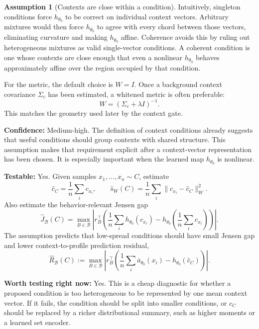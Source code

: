 \documentclass[11pt]{article}
\theoremstyle{definition}
\theoremstyle{definition}
\theoremstyle{assumptionstyle}
\newtheorem{assumption}{Assumption}[section]
\newcounter{prediction}
\begin{document}
\begin{assumption}[Contexts are close within a condition]
Intuitively, singleton conditions force \(h_{\theta_0}\) to be correct on
individual context vectors. Arbitrary mixtures would then force
\(h_{\theta_0}\) to agree with every chord between those vectors, eliminating
curvature and making \(h_{\theta_0}\) affine. Coherence avoids this by ruling out
heterogeneous mixtures as valid single-vector conditions. A coherent condition is
one whose contexts are close enough that even a nonlinear \(h_{\theta_0}\) behaves
approximately affine over the region occupied by that condition.

For the metric, the default choice is \(W=I\). Once a background context
covariance \(\Sigma_c\) has been estimated, a whitened metric is often preferable:
\[
W=(\Sigma_c+\lambda I)^{-1}.
\]
This matches the geometry used later by the context gate.
\end{assumption}
\textbf{Confidence:} Medium-high. The definition of context conditions already
suggests that useful conditions should group contexts with shared structure. This
assumption makes that requirement explicit after a context-vector representation
has been chosen. It is especially important when the learned map
\(h_{\theta_0}\) is nonlinear.

\textbf{Testable:} Yes. Given samples \(x_1,\ldots,x_n\sim C\), estimate
\[
\widehat c_C=\frac1n\sum_i c_{x_i},
\qquad
\widehat s_W(C)
=
\frac1n\sum_i\|c_{x_i}-\widehat c_C\|_W^2.
\]
Also estimate the behavior-relevant Jensen gap
\[
\widehat J_{\mathcal B}(C)
=
\max_{B\in\mathcal B}
\left|
r_B^\top
\left(
\frac1n\sum_i h_{\theta_0}(c_{x_i})
-
h_{\theta_0}\!\left(\frac1n\sum_i c_{x_i}\right)
\right)
\right|.
\]
The assumption predicts that low-spread conditions should have small Jensen gap
and lower context-to-profile prediction residual,
\[
\widehat R_{\mathcal B}(C)
:=
\max_{B\in\mathcal B}
\left|
r_B^\top
\left(
\frac1n\sum_i \bar a_{\theta_0}(x_i)
-
h_{\theta_0}(\widehat c_C)
\right)
\right|.
\]

\textbf{Worth testing right now:} Yes. This is a cheap diagnostic for whether a
proposed condition is too heterogeneous to be represented by one mean context
vector. If it fails, the condition should be split into smaller conditions, or
\(c_C\) should be replaced by a richer distributional summary, such as higher
moments or a learned set encoder.
\end{document}
